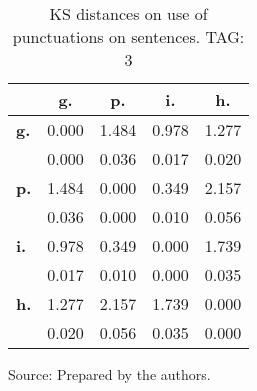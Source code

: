 \begin{table}[h!]
\begin{center}
\caption{KS distances on use of punctuations on sentences. TAG: 3}
\begin{tabular}{| l || c | c | c | c |}\hline
 & {\bf g.} & {\bf p.} & {\bf i.} & {\bf h.} \\\hline\hline
{\bf g.} & 0.000 & 1.484 & 0.978 & 1.277 \\
{\bf } & 0.000 & 0.036 & 0.017 & 0.020 \\\hline
{\bf p.} & 1.484 & 0.000 & 0.349 & 2.157 \\
{\bf } & 0.036 & 0.000 & 0.010 & 0.056 \\\hline
{\bf i.} & 0.978 & 0.349 & 0.000 & 1.739 \\
{\bf } & 0.017 & 0.010 & 0.000 & 0.035 \\\hline
{\bf h.} & 1.277 & 2.157 & 1.739 & 0.000 \\
{\bf } & 0.020 & 0.056 & 0.035 & 0.000 \\\hline
\end{tabular}
\begin{flushleft}
		Source: Prepared by the authors.\
\end{flushleft}
\end{center}
\end{table}
